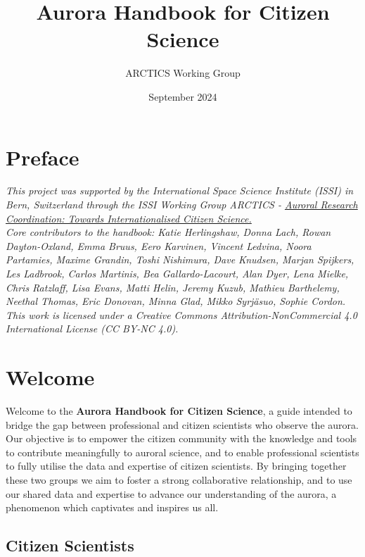 \documentclass{article}
\title{Aurora Handbook for Citizen Science}
\author{ARCTICS Working Group}
\date{September 2024}
\newcommand{\contributed}[1]{%
    \par\noindent
    \begingroup
    \setlength{\leftskip}{1em}%
    \itshape
    Contributors: #1
    \par
    \endgroup
    \vspace{0.5em}
}
\begin{document}
\maketitle
\tableofcontents
\newpage

\section{Preface}
\textit{This project was supported by the International Space Science Institute (ISSI) in Bern, Switzerland through the ISSI Working Group ARCTICS - \href{https://collab.issibern.ch/arctics/}{Auroral Research Coordination: Towards Internationalised Citizen Science.}}\\
\textit{Core contributors to the handbook: Katie Herlingshaw, Donna Lach, Rowan Dayton-Oxland, Emma Bruus, Eero Karvinen, Vincent Ledvina, Noora Partamies, Maxime Grandin, Toshi Nishimura, Dave Knudsen, Marjan Spijkers, Les Ladbrook, Carlos Martinis, Bea Gallardo-Lacourt, Alan Dyer, Lena Mielke, Chris Ratzlaff, Lisa Evans, Matti Helin, Jeremy Kuzub, Mathieu Barthelemy, Neethal Thomas, Eric Donovan, Minna Glad, Mikko Syrjäsuo, Sophie Cordon.}\\
\textit{This work is licensed under a Creative Commons Attribution-NonCommercial 4.0 International License (CC BY-NC 4.0).}

 
\section{Welcome}
Welcome to the {\bf Aurora Handbook for Citizen Science}, a guide intended to bridge the gap between professional and citizen scientists who observe the aurora. Our objective is to empower the citizen community with the knowledge and tools to contribute meaningfully to auroral science, and to enable professional scientists to fully utilise the data and expertise of citizen scientists. By bringing together these two groups we aim to foster a strong collaborative relationship, and to use our shared data and expertise to advance our understanding of the aurora, a phenomenon which captivates and inspires us all. 

\subsection{Citizen Scientists}
\end{document}
